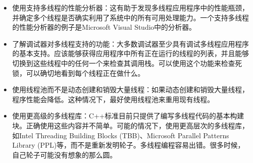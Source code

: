 \begin{itemize}
\item
使用支持多线程的性能分析器：这有助于发现多线程应用程序中的性能瓶颈，并确定多个线程是否确实利用了系统中的所有可用处理能力。一个支持多线程的性能分析器的例子是Microsoft Visual Studio中的分析器。

\item
了解调试器对多线程支持的功能：大多数调试器至少具有调试多线程应用程序的基本支持。应该能够获得应用程序中所有正在运行的线程的列表，并且能够切换到这些线程中的任何一个来检查其调用栈。可以使用这个功能来检查死锁，可以确切地看到每个线程正在做什么。

\item
使用线程池而不是动态创建和销毁大量线程：如果动态创建和销毁大量线程，程序性能会降低。这种情况下，最好使用线程池来重用现有线程。

\item
使用更高级的多线程库：C++标准目前只提供了编写多线程代码的基本构建块。正确使用这些内容并不简单。可能的情况下，使用更高层次的多线程库，如Intel Threading Building Blocks (TBB)、Microsoft Parallel Patterns Library (PPL)等，而不是重新发明轮子。多线程编程容易出错。很多时候，自己轮子可能没有想象的那么圆。
\end{itemize}









































